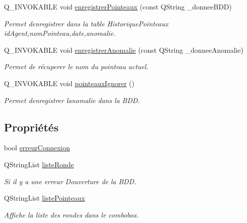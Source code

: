 \begin{DoxyCompactItemize}
Q\+\_\+\+I\+N\+V\+O\+K\+A\+B\+LE void \hyperlink{class_base_b_d_d_a52ff865a9fc36b11a9c2cbdb8cd9daa1}{enregistrer\+Pointeaux} (const Q\+String \+\_\+donnee\+B\+DD)
\begin{DoxyCompactList}\small\item\em Permet d\textquotesingle{}enregistrer dans la table Historique\+Pointeaux id\+Agent,nom\+Pointeau,date,anomalie. \end{DoxyCompactList}\item 
Q\+\_\+\+I\+N\+V\+O\+K\+A\+B\+LE void \hyperlink{class_base_b_d_d_a9c5f51c11f49e494e608a9dafb635629}{enregistrer\+Anomalie} (const Q\+String \+\_\+donnee\+Anomalie)
\begin{DoxyCompactList}\small\item\em Permet de récuperer le nom du pointeau actuel. \end{DoxyCompactList}\item 
Q\+\_\+\+I\+N\+V\+O\+K\+A\+B\+LE void \hyperlink{class_base_b_d_d_acbdf1ddaaaff9fa469ecef3a14ef1081}{pointeaux\+Ignorer} ()
\begin{DoxyCompactList}\small\item\em Permet d\textquotesingle{}enregistrer l\textquotesingle{}anomalie dans la B\+DD. \end{DoxyCompactList}\end{DoxyCompactItemize}
\subsection*{Propriétés}
\begin{DoxyCompactItemize}
\item 
bool \hyperlink{class_base_b_d_d_a11fdd43781eea1fe6f9b9b91d83a4a64}{erreur\+Connexion}
\item 
Q\+String\+List \hyperlink{class_base_b_d_d_abb6ff92708dd4be7304be2b3e74930c4}{liste\+Ronde}
\begin{DoxyCompactList}\small\item\em Si il y a une erreur D\textquotesingle{}ouverture de la B\+DD. \end{DoxyCompactList}\item 
Q\+String\+List \hyperlink{class_base_b_d_d_a706e89c393728daa3478dfe83208489c}{liste\+Pointeaux}
\begin{DoxyCompactList}\small\item\em Affiche la liste des rondes dans le combobox. \end{DoxyCompactList}\end{DoxyCompactItemize}


